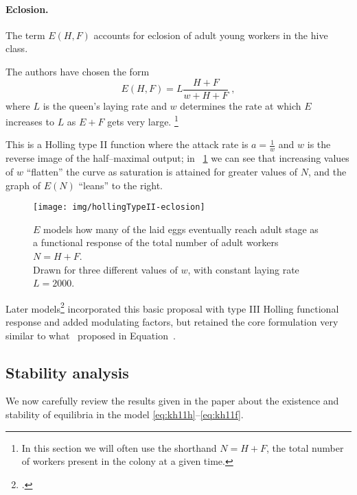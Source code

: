 \paragraph{Eclosion.}
The term $E(H,F)$ accounts for eclosion of adult young workers in the hive class.

The authors have chosen the form
\begin{equation}
    \label{eq:eclos}
    E(H,F) = L \frac{H+F}{w + H + F} \; ,
\end{equation}
where $L$ is the queen's laying rate and $w$ determines the rate at which $E$ increases to $L$ as $E+F$ gets very large.
\footnote{In this section we will often use the shorthand $N=H+F$, the total number of workers present in the colony at a given time.}

This is a Holling type II function where the attack rate is $a=\frac{1}{w}$ and $w$ is the reverse image of the half--maximal output; in \figurename~\ref{img:eclos} we can see that increasing values of $w$ ``flatten'' the curve
as saturation is attained for greater values of $N$, and the graph of $E(N)$ ``leans'' to the right.

\begin{figure}[pbh]
    \centering
    \texttt{[image: img/hollingTypeII-eclosion]}

    \caption[Holling type II Eclosion]{$E$ models how many of the laid eggs eventually reach adult stage as a functional response of the total number of adult workers $N=H+F$.
    \\
    Drawn for three different values of $w$, with constant laying rate $L=2000$.}
    \label{img:eclos}
\end{figure}

Later models\footcite{ratti2017} incorporated this basic proposal with type III Holling functional response and added modulating factors, but retained the core formulation very similar to what~\citeauthor{khoury2011} proposed in Equation~.


\subsection{Stability analysis}
We now carefully review the results given in the paper about the existence and stability of equilibria in the model \eqref{eq:kh11h}--\eqref{eq:kh11f}.

